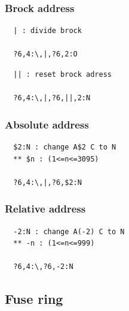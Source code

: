 \documentclass[a4paper]{article}
\makeatletter
\def\MCFstructure{\hspace{5mm}{\@strufont\char\fontnum}\advance\fontnum\@ne\relax}%
\makeatother
\begin{document}
\subsubsection{Brock address}
\begin{verbatim}
  | : divide brock

  ?6,4:\,|,?6,2:O
\end{verbatim}
\MCFstructure
\begin{verbatim}
  || : reset brock adress

  ?6,4:\,|,?6,||,2:N
\end{verbatim}
\MCFstructure
\subsubsection{Absolute address}
\begin{verbatim}
  $2:N : change A$2 C to N
  ** $n : (1<=n<=3095)

  ?6,4:\,|,?6,$2:N
\end{verbatim}
\MCFstructure
\subsubsection{Relative address}
\begin{verbatim}
  -2:N : change A(-2) C to N
  ** -n : (1<=n<=999)

  ?6,4:\,?6,-2:N
\end{verbatim}
\MCFstructure
\subsection{Fuse ring}
\end{document}
